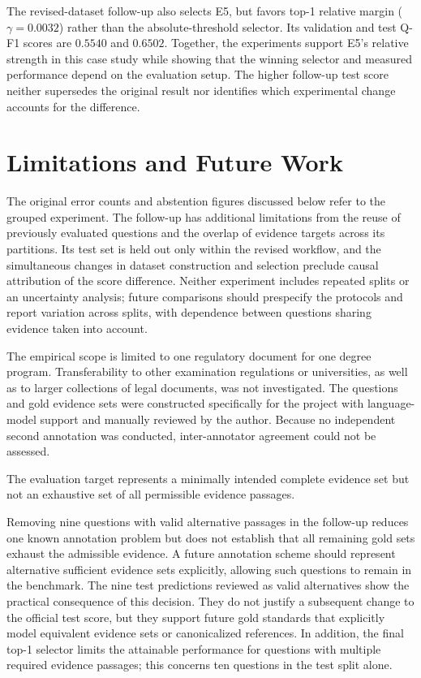 \documentclass[11pt]{article}
\newcommand{\revision}[1]{#1}
\begin{document}
\revision{The revised-dataset follow-up also selects E5, but favors top-1 relative margin ($\gamma=0.0032$) rather than the absolute-threshold selector. Its validation and test Q-F1 scores are $0.5540$ and $0.6502$. Together, the experiments support E5's relative strength in this case study while showing that the winning selector and measured performance depend on the evaluation setup. The higher follow-up test score neither supersedes the original result nor identifies which experimental change accounts for the difference.}


\section{Limitations and Future Work}

\revision{The original error counts and abstention figures discussed below refer to the grouped experiment. The follow-up has additional limitations from the reuse of previously evaluated questions and the overlap of evidence targets across its partitions. Its test set is held out only within the revised workflow, and the simultaneous changes in dataset construction and selection preclude causal attribution of the score difference. Neither experiment includes repeated splits or an uncertainty analysis; future comparisons should prespecify the protocols and report variation across splits, with dependence between questions sharing evidence taken into account.}

The empirical scope is limited to one regulatory document for one degree program. Transferability to other examination regulations or universities, as well as to larger collections of legal documents, was not investigated. The questions and gold evidence sets were constructed specifically for the project with language-model support and manually reviewed by the author. Because no independent second annotation was conducted, inter-annotator agreement could not be assessed.

The evaluation target represents a minimally intended complete evidence set but not an exhaustive set of all permissible evidence passages.

\revision{Removing nine questions with valid alternative passages in the follow-up reduces one known annotation problem but does not establish that all remaining gold sets exhaust the admissible evidence. A future annotation scheme should represent alternative sufficient evidence sets explicitly, allowing such questions to remain in the benchmark.} The nine test predictions reviewed as valid alternatives show the practical consequence of this decision. They do not justify a subsequent change to the official test score, but they support future gold standards that explicitly model equivalent evidence sets or canonicalized references. In addition, the final top-1 selector limits the attainable performance for questions with multiple required evidence passages; this concerns ten questions in the test split alone.
\end{document}
